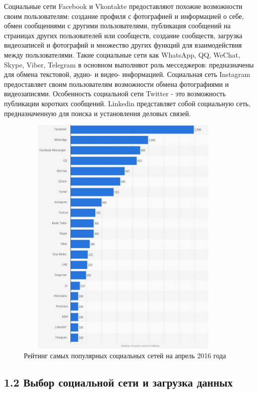 \documentclass[a4paper]{report}
\begin{document}
	Социальные сети Facebook и Vkontakte предоставляют похожие возможности своим пользователям: создание профиля с фотографией и информацией о себе, обмен сообщениями с другими пользователями, публикация сообщений на страницах других пользователей или сообществ, создание сообществ, загрузка видеозаписей и фотографий и множество других функций для взаимодействия между пользователями. Такие социальные сети как WhatsApp, QQ, WeChat, Skype, Viber, Telegram в основном выполняют роль месседжеров: предназначены для обмена текстовой, аудио- и видео- информацией. Социальная сеть Instagram предоставляет своим пользователям возможности обмена фотографиями и видеозаписями. Особенность социальной сети Twitter - это возможность публикации коротких сообщений. Linkedin представляет собой социальную сеть, предназначенную для поиска и установления деловых связей.
	
	
	
	


	
	\begin{figure}
		\centering
		\includegraphics[width=400px,height=450px]
		{imgs/NetworkStatistics.jpg}
		\caption{Рейтинг самых популярных  социальных сетей на апрель 2016 года}
		\label{fig:stat}
	\end{figure}
	
	
	
	
	
	\subsection{1.2 Выбор социальной сети и загрузка данных}
	
\end{document}
